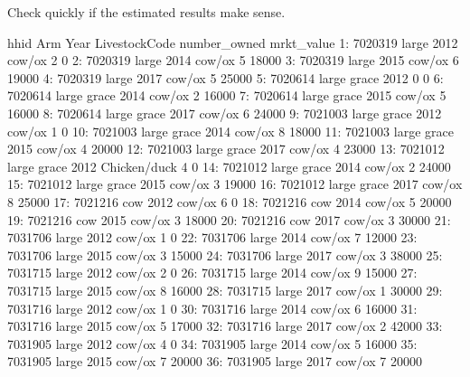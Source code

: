 Check quickly if the estimated results make sense.
\begin{Schunk}
\begin{Soutput}
       hhid         Arm Year LivestockCode number_owned mrkt_value
 1: 7020319       large 2012        cow/ox            2          0
 2: 7020319       large 2014        cow/ox            5      18000
 3: 7020319       large 2015        cow/ox            6      19000
 4: 7020319       large 2017        cow/ox            5      25000
 5: 7020614 large grace 2012                          0          0
 6: 7020614 large grace 2014        cow/ox            2      16000
 7: 7020614 large grace 2015        cow/ox            5      16000
 8: 7020614 large grace 2017        cow/ox            6      24000
 9: 7021003 large grace 2012        cow/ox            1          0
10: 7021003 large grace 2014        cow/ox            8      18000
11: 7021003 large grace 2015        cow/ox            4      20000
12: 7021003 large grace 2017        cow/ox            4      23000
13: 7021012 large grace 2012  Chicken/duck            4          0
14: 7021012 large grace 2014        cow/ox            2      24000
15: 7021012 large grace 2015        cow/ox            3      19000
16: 7021012 large grace 2017        cow/ox            8      25000
17: 7021216         cow 2012        cow/ox            6          0
18: 7021216         cow 2014        cow/ox            5      20000
19: 7021216         cow 2015        cow/ox            3      18000
20: 7021216         cow 2017        cow/ox            3      30000
21: 7031706       large 2012        cow/ox            1          0
22: 7031706       large 2014        cow/ox            7      12000
23: 7031706       large 2015        cow/ox            3      15000
24: 7031706       large 2017        cow/ox            3      38000
25: 7031715       large 2012        cow/ox            2          0
26: 7031715       large 2014        cow/ox            9      15000
27: 7031715       large 2015        cow/ox            8      16000
28: 7031715       large 2017        cow/ox            1      30000
29: 7031716       large 2012        cow/ox            1          0
30: 7031716       large 2014        cow/ox            6      16000
31: 7031716       large 2015        cow/ox            5      17000
32: 7031716       large 2017        cow/ox            2      42000
33: 7031905       large 2012        cow/ox            4          0
34: 7031905       large 2014        cow/ox            5      16000
35: 7031905       large 2015        cow/ox            7      20000
36: 7031905       large 2017        cow/ox            7      20000

\end{Soutput}
\end{Schunk}
